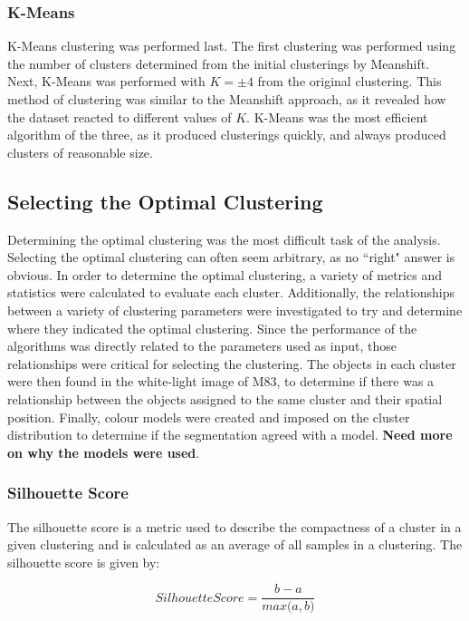 \subsubsection{K-Means}
K-Means clustering was performed last.
The first clustering was performed using the number of clusters determined from the initial clusterings by Meanshift.
Next, K-Means was performed with $K = \pm 4$ from the original clustering.
This method of clustering was similar to the Meanshift approach, as it revealed how the dataset reacted to different values of $K$.
K-Means was the most efficient algorithm of the three, as it produced clusterings quickly, and always produced clusters of reasonable size.

\subsection{Selecting the Optimal Clustering}
Determining the optimal clustering was the most difficult task of the analysis.
Selecting the optimal clustering can often seem arbitrary, as no ``right" answer is obvious.
In order to determine the optimal clustering, a variety of metrics and statistics were calculated to evaluate each cluster.
Additionally, the relationships between a variety of clustering parameters were investigated to try and determine where they indicated the optimal clustering.
Since the performance of the algorithms was directly related to the parameters used as input, those relationships were critical for selecting the clustering.
The objects in each cluster were then found in the white-light image of M83, to determine if there was a relationship between the objects assigned to the same cluster and their spatial position.
Finally, colour models were created and imposed on the cluster distribution to determine if the segmentation agreed with a model. \textbf{Need more on why the models were used}.

\subsubsection{Silhouette Score}
The silhouette score is a metric used to describe the compactness of a cluster in a given clustering and is calculated as an average of all samples in a clustering.  
The silhouette score is given by:

\begin{equation}
\label{eq:ss}
Silhouette Score = \frac{b - a}{\textit{max}\big(a, b\big)}
\end{equation}

